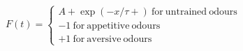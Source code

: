  $F(t) =  \begin{cases} A+\exp(−x/τ+)\:\mathrm{for\:untrained\:odours}\\-1\:\mathrm{for\:appetitive\:odours}\\+1\:\mathrm{for\:aversive\:odours} \end{cases}$
 